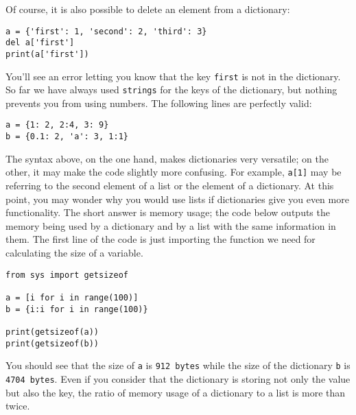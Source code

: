 
Of course, it is also possible to delete an element from a dictionary:

\begin{verbatim}
a = {'first': 1, 'second': 2, 'third': 3}
del a['first']
print(a['first'])
\end{verbatim}

You'll see an error letting you know that the key \texttt{first} is not in the dictionary. So far we have always used \texttt{strings} for the keys of the dictionary, but nothing prevents you from using numbers. The following lines are perfectly valid:

\begin{verbatim}
a = {1: 2, 2:4, 3: 9}
b = {0.1: 2, 'a': 3, 1:1}
\end{verbatim}

The syntax above, on the one hand, makes dictionaries very versatile; on the other, it may make the code slightly more confusing. For example, \texttt{a[1]} may be referring to the second element of a list or the element of a dictionary. At this point, you may wonder why you would use lists if dictionaries give you even more functionality. The short answer is memory usage; the code below outputs the memory being used by a dictionary and by a list with the same information in them. The first line of the code is just importing the function we need for calculating the size of a variable.

\begin{verbatim}
from sys import getsizeof

a = [i for i in range(100)]
b = {i:i for i in range(100)}

print(getsizeof(a))
print(getsizeof(b))
\end{verbatim}

You should see that the size of \texttt{a} is \texttt{912\ bytes} while the size of the dictionary \texttt{b} is \texttt{4704\ bytes}. Even if you consider that the dictionary is storing not only the value but also the key, the ratio of memory usage of a dictionary to a list is more than twice.

